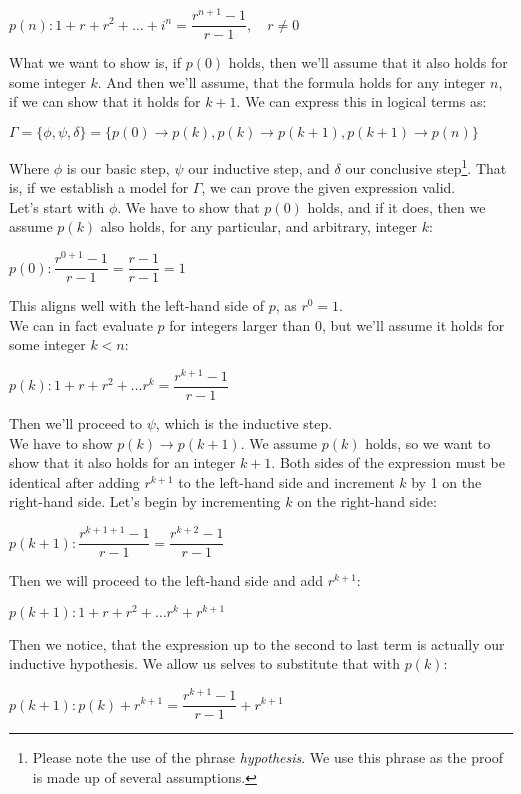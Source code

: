 \documentclass{report}
\newcommand{\cent}[1]{\begin{center}#1\end{center}}
\begin{document}
	\cent{$p(n) : 1 + r + r^2 + \dots + i^n = \dfrac{r^{n+1} - 1}{r-1}, \quad r \neq 0$}
	 	
 	What we want to show is, if $p(0)$ holds, then we'll assume that it also holds for some integer $k$. And then we'll assume, that the formula holds for any integer $n$, if we can show that it holds for $k+1$. We can express this in logical terms as:
 	
 	\cent{$\Gamma = \{\phi, \psi , \delta\} =  \{p(0) \to p(k),  p(k) \to p(k+1), p(k+1)  \to p(n)\}$}
 	
 	Where $\phi$ is our basic step, $\psi$ our inductive step, and $\delta$ our conclusive step\footnote{Please note the use of the phrase \textit{hypothesis}. We use this phrase as the proof is made up of several assumptions.}. That is, if we establish a model for $\Gamma$, we can prove the given expression valid.\\
 	
  	Let's start with $\phi$. We have to show that $p(0)$ holds, and if it does, then we assume $p(k)$ also holds, for any particular, and arbitrary, integer $k$:
 	
 	\cent{$p(0) : \dfrac{r^{0+1} - 1}{r-1} = \dfrac{r-1}{r-1} = 1$}
 	
 	This aligns well with the left-hand side of $p$, as $r^0 = 1$.\\
 	
 	We can in fact evaluate $p$ for integers larger than 0, but we'll assume it holds for some integer $k < n$:
 	
 	\cent{$p(k) : 1 + r + r^2 + \dots r^k = \dfrac{r^{k+1} - 1}{r-1}$}
 	
 	Then we'll proceed to $\psi$, which is the inductive step.\\
 	
 	We have to show $p(k) \to p(k+1)$. We assume $p(k)$ holds, so we want to show that  it also holds for an integer $k+1$. Both sides of the expression must be identical after adding $r^{k+1}$ to the left-hand side and increment $k$ by 1 on the right-hand side. Let's begin by incrementing $k$ on the right-hand side:
 	
 	\cent{$p(k+1) : \dfrac{r^{k+1+1} - 1}{r-1} = \dfrac{r^{k+2} - 1}{r-1}$}
 	
 	Then we will proceed to the left-hand side and add $r^{k+1}$:
 	
 	\cent{$p(k+1) : 1 + r + r^2 + \dots r^k + r^{k+1} $}
 	
 	Then we notice, that the expression up to the second to last term is actually our inductive hypothesis. We allow us selves to substitute that with $p(k)$:
 	\cent{$p(k+1) : p(k) + r^{k+1} = \dfrac{r^{k+1} - 1}{r-1} + r^{k+1} $}
 	
\end{document}
